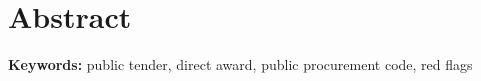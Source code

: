 \chapter*{Abstract}
\label{chap:abstract}

\textbf{Keywords:} public tender, direct award, public procurement code, red flags
